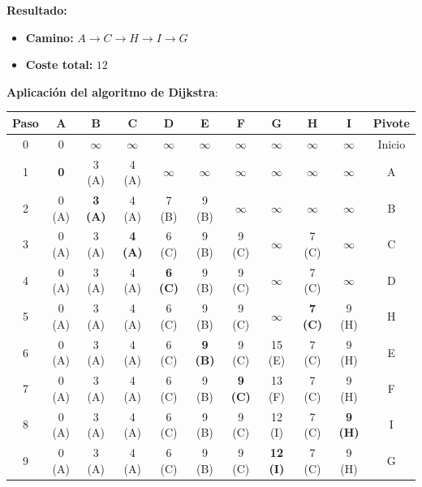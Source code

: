 \documentclass[11pt, a4paper]{article}
\newenvironment{problem}[1][Cuestión]{
	\vspace{0.5cm}
	\noindent{\Large\bfseries #1} \par\vspace{0.5cm}
}{
	\vspace{0.5cm}
}
\begin{document}
\begin{problem}[Cuestión 5 (30\%)]
{			\textbf{Resultado:}

			\begin{itemize}[label={}]
				\item \textbf{Camino:} $A \rightarrow C \rightarrow H \rightarrow I \rightarrow G$
				\item \textbf{Coste total:} $12$
			\end{itemize}

			\vspace{0.5cm}

			\textbf{Aplicación del algoritmo de Dijkstra}:

			\begin{table}[htpb]
				\centering
				\renewcommand{\arraystretch}{1.2}
				\color{blue}
				\begin{tabular}{|c|c|c|c|c|c|c|c|c|c|c|}
					\hline
					\textbf{Paso} & \textbf{A} & \textbf{B} & \textbf{C} & \textbf{D} & \textbf{E} & \textbf{F} & \textbf{G} & \textbf{H} & \textbf{I} & \textbf{Pivote} \\ \hline\hline
					0 & 0 & $\infty$ & $\infty$ & $\infty$ & $\infty$ & $\infty$ & $\infty$ & $\infty$ & $\infty$ & Inicio \\ \hline
					1 & \textbf{0} & 3 (A) & 4 (A) & $\infty$ & $\infty$ & $\infty$ & $\infty$ & $\infty$ & $\infty$ & A \\ \hline
					2 & 0 (A) & \textbf{3 (A)} & 4 (A) & 7 (B) & 9 (B) & $\infty$ & $\infty$ & $\infty$ & $\infty$ & B \\ \hline
					3 & 0 (A) & 3 (A) & \textbf{4 (A)} & 6 (C) & 9 (B) & 9 (C) & $\infty$ & 7 (C) & $\infty$ & C \\ \hline
					4 & 0 (A) & 3 (A) & 4 (A) & \textbf{6 (C)} & 9 (B) & 9 (C) & $\infty$ & 7 (C) & $\infty$ & D \\ \hline
					5 & 0 (A) & 3 (A) & 4 (A) & 6 (C) & 9 (B) & 9 (C) & $\infty$ & \textbf{7 (C)} & 9 (H) & H \\ \hline
					6 & 0 (A) & 3 (A) & 4 (A) & 6 (C) & \textbf{9 (B)} & 9 (C) & 15 (E) & 7 (C) & 9 (H) & E \\ \hline
					7 & 0 (A) & 3 (A) & 4 (A) & 6 (C) & 9 (B) & \textbf{9 (C)} & 13 (F) & 7 (C) & 9 (H) & F \\ \hline
					8 & 0 (A) & 3 (A) & 4 (A) & 6 (C) & 9 (B) & 9 (C) & 12 (I) & 7 (C) & \textbf{9 (H)} & I \\ \hline
					9 & 0 (A) & 3 (A) & 4 (A) & 6 (C) & 9 (B) & 9 (C) & \textbf{12 (I)} & 7 (C) & 9 (H) & G \\ \hline
				\end{tabular}
			\end{table}

}
\end{problem}
\end{document}
